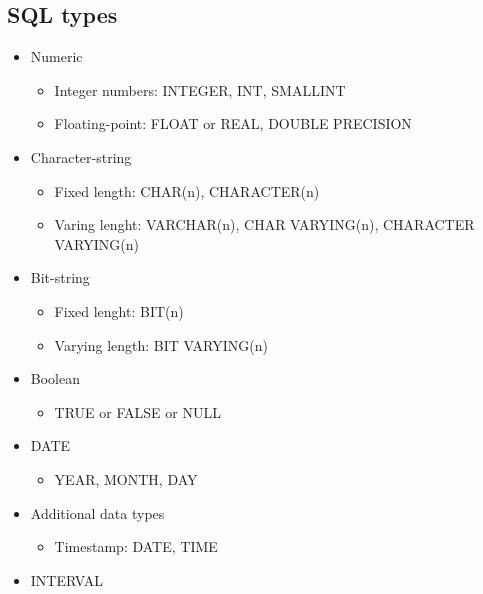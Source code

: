 \begin{multicols}{2}
\subsection{SQL types}
\begin{itemize}
    \item Numeric
    \begin{itemize}
        \item Integer numbers: INTEGER, INT, SMALLINT
        \item Floating-point: FLOAT or REAL, DOUBLE PRECISION
    \end{itemize}
    \item Character-string
    \begin{itemize}
        \item Fixed length: CHAR(n), CHARACTER(n)
        \item Varing lenght: VARCHAR(n), CHAR VARYING(n), CHARACTER VARYING(n)
    \end{itemize}
    \item Bit-string
    \begin{itemize}
        \item Fixed lenght: BIT(n)
        \item Varying length: BIT VARYING(n)
    \end{itemize}
    \item Boolean
    \begin{itemize}
        \item TRUE or FALSE or NULL
    \end{itemize}
    \item DATE
    \begin{itemize}
        \item YEAR, MONTH, DAY
    \end{itemize}
    \item Additional data types 
    \begin{itemize}
        \item Timestamp: DATE, TIME
    \end{itemize}
    \item INTERVAL
\end{itemize}
\end{multicols}
\raggedcolumns


\newpage
